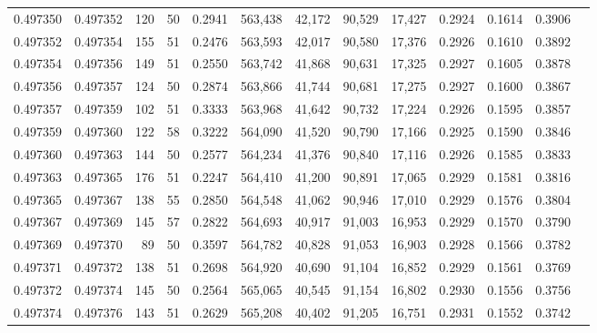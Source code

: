 \begin{tabular}{rrrrrrrrrrrrr}
0.497350 & 0.497352 &   120 &  50 &                                     0.2941 & 563,438 &  42,172 &  90,529 &  17,427 & 0.2924 & 0.1614 & 0.3906 \\
0.497352 & 0.497354 &   155 &  51 &                                     0.2476 & 563,593 &  42,017 &  90,580 &  17,376 & 0.2926 & 0.1610 & 0.3892 \\
0.497354 & 0.497356 &   149 &  51 &                                     0.2550 & 563,742 &  41,868 &  90,631 &  17,325 & 0.2927 & 0.1605 & 0.3878 \\
0.497356 & 0.497357 &   124 &  50 &                                     0.2874 & 563,866 &  41,744 &  90,681 &  17,275 & 0.2927 & 0.1600 & 0.3867 \\
0.497357 & 0.497359 &   102 &  51 &                                     0.3333 & 563,968 &  41,642 &  90,732 &  17,224 & 0.2926 & 0.1595 & 0.3857 \\
0.497359 & 0.497360 &   122 &  58 &                                     0.3222 & 564,090 &  41,520 &  90,790 &  17,166 & 0.2925 & 0.1590 & 0.3846 \\
0.497360 & 0.497363 &   144 &  50 &                                     0.2577 & 564,234 &  41,376 &  90,840 &  17,116 & 0.2926 & 0.1585 & 0.3833 \\
0.497363 & 0.497365 &   176 &  51 &                                     0.2247 & 564,410 &  41,200 &  90,891 &  17,065 & 0.2929 & 0.1581 & 0.3816 \\
0.497365 & 0.497367 &   138 &  55 &                                     0.2850 & 564,548 &  41,062 &  90,946 &  17,010 & 0.2929 & 0.1576 & 0.3804 \\
0.497367 & 0.497369 &   145 &  57 &                                     0.2822 & 564,693 &  40,917 &  91,003 &  16,953 & 0.2929 & 0.1570 & 0.3790 \\
0.497369 & 0.497370 &    89 &  50 &                                     0.3597 & 564,782 &  40,828 &  91,053 &  16,903 & 0.2928 & 0.1566 & 0.3782 \\
0.497371 & 0.497372 &   138 &  51 &                                     0.2698 & 564,920 &  40,690 &  91,104 &  16,852 & 0.2929 & 0.1561 & 0.3769 \\
0.497372 & 0.497374 &   145 &  50 &                                     0.2564 & 565,065 &  40,545 &  91,154 &  16,802 & 0.2930 & 0.1556 & 0.3756 \\
0.497374 & 0.497376 &   143 &  51 &                                     0.2629 & 565,208 &  40,402 &  91,205 &  16,751 & 0.2931 & 0.1552 & 0.3742 \\

\end{tabular}
